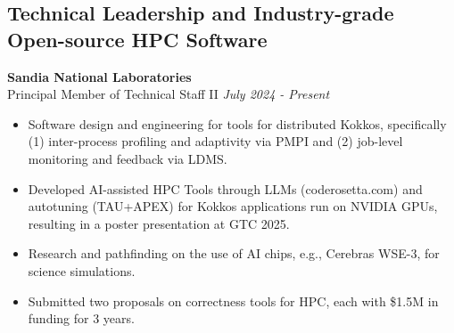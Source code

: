 



\newcommand{\myExpOne}{
\item Software design and engineering for tools for distributed Kokkos, specifically (1) inter-process profiling and adaptivity via PMPI and (2) job-level monitoring and feedback via LDMS.
\item Developed AI-assisted HPC Tools through LLMs (coderosetta.com) and autotuning (TAU+APEX) for Kokkos applications run on NVIDIA GPUs, resulting in a poster presentation at GTC 2025. 
\item Research and pathfinding on the use of AI chips, e.g., Cerebras WSE-3, for science simulations. 
\item Submitted two proposals on correctness tools for HPC, each with \$1.5M in funding for 3 years. 
}

\subsection*{Technical Leadership and Industry-grade Open-source HPC Software}
\textbf{Sandia National Laboratories}\\
{Principal Member of Technical Staff II} \hfill \textit{July 2024 - Present}
\noindent
\begin{itemize}[itemsep=-0.1em]\onlyitems[include={1,2}]
\myExpOne
\end{itemize}


\newcommand{\myExpTwo}{
	\item Developed and maintained Kokkos Tools for the CMake and Spack build system, tooling overheads, CI/CD, auto-tuning, and nvtx/roctx/vtune integration, leading to 15 merged github PRs.
   \item Developed a debugging tool that detected 7 common Kokkos user bugs by analyzing LLVM IR of Kokkos programs via symbolic execution, leading to a paper at SC24's Correctness workshop. 
    \item Implemented new features in LLVM OpenMP, leading to a 1.2x speedup for a Kokkos-OpenMP+CUDA benchmark, 3 OpenMP 6.0 features, and 19 feature proposals for OpenMP 6.1.
}


